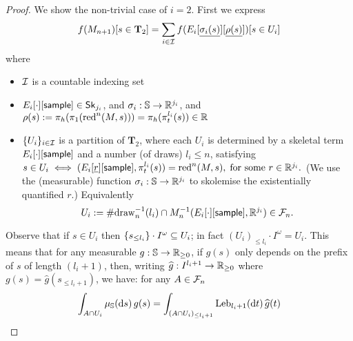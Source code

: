 \begin{proof}
We show the non-trivial case of $i = 2$.
First we express 
\begin{equation}
f(M_{n+1})[s \in \mathbf{T}_2] = \sum_{i \in \calI} 
f(E_i[\underline{\sigma_i(s)}][\underline{\rho(s)}])[s \in U_i]
\label{eqn:f 2 n+1}
\end{equation}
where 
\begin{itemize}
\item $\mathcal{I}$ is a countable indexing set
\item $E_i[\cdot][\mathsf{sample}] \in \mathsf{Sk}_{j_i}$, and $\sigma_i : {\mathbb{S}} \to \mathbb{R}^{j_i}$, and $\rho(s) := \pi_h(\pi_1(\operatorname{red}^n(M, s))) = \pi_h(\pi_t^{l_i}(s)) \in \mathbb{R}$ 
\item $\{{U_i}\}_{i \in \mathcal{I}}$ is a partition of $\mathbf{T}_2$, 
where each $U_i$ is determined by a skeletal term $E_i[\cdot][\mathsf{sample}]$ and a number (of draws) $l_i \leq n$, satisfying
\(
s \in U_i
\iff
(E_i[\underline{r}][{\mathsf{sample}}], \pi_t^{l_i}(s)) = \operatorname{red}^n(M, s),
\;
\hbox{for some }r \in \mathbb{R}^{j_i}.
\)
(We use the (measurable) function $\sigma_i : {\mathbb{S}} \to \mathbb{R}^{j_i}$ to skolemise the existentially quantified $r$.)
Equivalently
\[
U_i := \#\mathrm{draw}_n^{-1}(l_i) \cap M_n^{-1}(E_i[\cdot][\mathsf{sample}], \mathbb{R}^{j_i}) \in \mathcal{F}_n.
\]
\end{itemize}

Observe that if $s \in U_i$ then $\{{s_{\leq l_i}}\} \cdot I^\omega \subseteq U_i$;
in fact $(U_i)_{\leq l_i} \cdot I^\omega = U_i$.
This means that for any measurable $g : {\mathbb{S}} \to \mathbb{R}_{\geq 0}$, if $g(s)$ only depends on the prefix of $s$ of length $(l_i+1)$, then, writing $\widehat{g} : I^{l_i+1} \to \mathbb{R}_{\geq 0}$ where $g(s) = \widehat{g}(s_{\leq l_i+1})$, we have: for any $A \in \mathcal{F}_n$ 
\begin{equation}
\int_{A \cap U_i}  \mu_{\entrosp}(\dif s) \, g(s) = 
\int_{(A \cap U_i)_{\leq l_i+1}} \Leb_{l_i+1}(\dif t) \, \widehat{g}(t)
\label{eqn:truncate}
\end{equation}


\end{proof}
